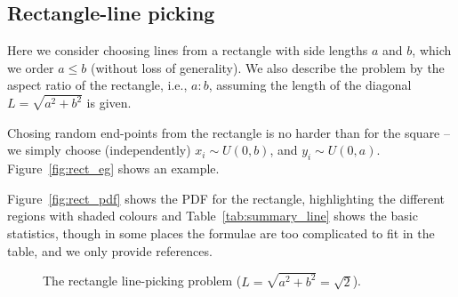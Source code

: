 \subsection{Rectangle-line picking}
\label{sec:rectangle_line}

Here we consider choosing lines from a rectangle with side lengths $a$
and $b$, which we order $a \leq b$ (without loss of generality).  We
also describe the problem by the aspect ratio of the rectangle, i.e.,
$a \!: \!b$, assuming the length of the diagonal $L=\sqrt{a^2+b^2}$ is
given. 

Chosing random end-points from the rectangle is no harder than for the
square -- we simply choose (independently) $x_i \sim U(0,b)$, and $y_i
\sim U(0,a)$. Figure~\ref{fig:rect_eg} shows an example.

Figure~\ref{fig:rect_pdf} shows the PDF for the rectangle,
highlighting the different regions with shaded colours and
Table~\ref{tab:summary_line} shows the basic statistics, though in
some places the formulae are too complicated to fit in the table, and
we only provide references.

\begin{figure}[htbp]
  \begin{center}
       \hspace{0.075\columnwidth}
    \caption{The rectangle line-picking problem ($L=\sqrt{a^2+b^2}=\sqrt{2}$).}
  \end{center} 
\vspace{-4mm}
\end{figure}

